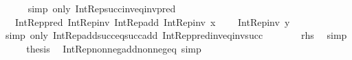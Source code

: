 \begin{isabellebody}
\ \ \ \ \isamarkupfalse%
\ {\isacharparenleft}{\kern0pt}simp\ only{\isacharcolon}{\kern0pt}\ Int{\isacharunderscore}{\kern0pt}Rep{\isacharunderscore}{\kern0pt}succ{\isacharunderscore}{\kern0pt}inv{\isacharunderscore}{\kern0pt}eq{\isacharunderscore}{\kern0pt}inv{\isacharunderscore}{\kern0pt}pred{\isacharparenright}{\kern0pt}\isanewline
\ \ \isamarkupfalse%
\ \isamarkupfalse%
\ {\isachardoublequoteopen}{\isachardot}{\kern0pt}{\isachardot}{\kern0pt}{\isachardot}{\kern0pt}\ {\isacharequal}{\kern0pt}\ Int{\isacharunderscore}{\kern0pt}Rep{\isacharunderscore}{\kern0pt}pred\ {\isacharparenleft}{\kern0pt}Int{\isacharunderscore}{\kern0pt}Rep{\isacharunderscore}{\kern0pt}inv\ {\isacharparenleft}{\kern0pt}Int{\isacharunderscore}{\kern0pt}Rep{\isacharunderscore}{\kern0pt}add\ {\isacharparenleft}{\kern0pt}Int{\isacharunderscore}{\kern0pt}Rep{\isacharunderscore}{\kern0pt}inv\ x{\isacharparenright}{\kern0pt}\isanewline
\ \ \ \ {\isacharparenleft}{\kern0pt}Int{\isacharunderscore}{\kern0pt}Rep{\isacharunderscore}{\kern0pt}inv\ y{\isacharparenright}{\kern0pt}{\isacharparenright}{\kern0pt}{\isacharparenright}{\kern0pt}{\isachardoublequoteclose}\isanewline
\ \ \ \ \isamarkupfalse%
\ {\isacharparenleft}{\kern0pt}simp\ only{\isacharcolon}{\kern0pt}\ Int{\isacharunderscore}{\kern0pt}Rep{\isacharunderscore}{\kern0pt}add{\isacharunderscore}{\kern0pt}succ{\isacharunderscore}{\kern0pt}eq{\isacharunderscore}{\kern0pt}succ{\isacharunderscore}{\kern0pt}add\ Int{\isacharunderscore}{\kern0pt}Rep{\isacharunderscore}{\kern0pt}pred{\isacharunderscore}{\kern0pt}inv{\isacharunderscore}{\kern0pt}eq{\isacharunderscore}{\kern0pt}inv{\isacharunderscore}{\kern0pt}succ{\isacharparenright}{\kern0pt}\isanewline
\ \ \isamarkupfalse%
\ \isamarkupfalse%
\ {\isachardoublequoteopen}{\isachardot}{\kern0pt}{\isachardot}{\kern0pt}{\isachardot}{\kern0pt}\ {\isacharequal}{\kern0pt}\ {\isacharquery}{\kern0pt}rhs{\isachardoublequoteclose}\ \isamarkupfalse%
\ simp\isanewline
\ \ \isamarkupfalse%
\ \isamarkupfalse%
\ {\isacharquery}{\kern0pt}thesis\ \isacommand{{\isachardot}{\kern0pt}}\isamarkupfalse%
\isanewline
{}\isamarkupfalse%
%
\endisatagproof
{\isafoldproof}%
%
\isadelimproof
\isanewline
%
\endisadelimproof
\isanewline
{}\isamarkupfalse%
\ Int{\isacharunderscore}{\kern0pt}Rep{\isacharunderscore}{\kern0pt}nonneg{\isacharunderscore}{\kern0pt}add{\isacharunderscore}{\kern0pt}nonneg{\isacharunderscore}{\kern0pt}eq\ {\isacharbrackleft}{\kern0pt}simp{\isacharbrackright}{\kern0pt}{\isacharcolon}{\kern0pt}\isanewline

\end{isabellebody}
